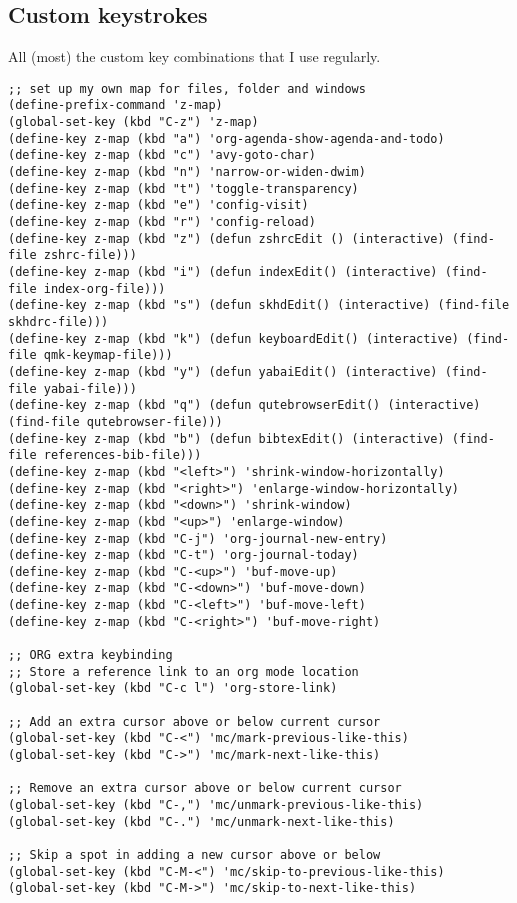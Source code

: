 \documentclass[11pt]{article}
\begin{document}
\subsection{Custom keystrokes}
\label{sec:org906f9f2}
All (most) the custom key combinations that I use regularly.
\begin{verbatim}
;; set up my own map for files, folder and windows
(define-prefix-command 'z-map)
(global-set-key (kbd "C-z") 'z-map)
(define-key z-map (kbd "a") 'org-agenda-show-agenda-and-todo)
(define-key z-map (kbd "c") 'avy-goto-char)
(define-key z-map (kbd "n") 'narrow-or-widen-dwim)
(define-key z-map (kbd "t") 'toggle-transparency)
(define-key z-map (kbd "e") 'config-visit)
(define-key z-map (kbd "r") 'config-reload)
(define-key z-map (kbd "z") (defun zshrcEdit () (interactive) (find-file zshrc-file)))
(define-key z-map (kbd "i") (defun indexEdit() (interactive) (find-file index-org-file)))
(define-key z-map (kbd "s") (defun skhdEdit() (interactive) (find-file skhdrc-file)))
(define-key z-map (kbd "k") (defun keyboardEdit() (interactive) (find-file qmk-keymap-file)))
(define-key z-map (kbd "y") (defun yabaiEdit() (interactive) (find-file yabai-file)))
(define-key z-map (kbd "q") (defun qutebrowserEdit() (interactive) (find-file qutebrowser-file)))
(define-key z-map (kbd "b") (defun bibtexEdit() (interactive) (find-file references-bib-file)))
(define-key z-map (kbd "<left>") 'shrink-window-horizontally)
(define-key z-map (kbd "<right>") 'enlarge-window-horizontally)
(define-key z-map (kbd "<down>") 'shrink-window)
(define-key z-map (kbd "<up>") 'enlarge-window)
(define-key z-map (kbd "C-j") 'org-journal-new-entry) 
(define-key z-map (kbd "C-t") 'org-journal-today)
(define-key z-map (kbd "C-<up>") 'buf-move-up)
(define-key z-map (kbd "C-<down>") 'buf-move-down)
(define-key z-map (kbd "C-<left>") 'buf-move-left)
(define-key z-map (kbd "C-<right>") 'buf-move-right)

;; ORG extra keybinding
;; Store a reference link to an org mode location
(global-set-key (kbd "C-c l") 'org-store-link)

;; Add an extra cursor above or below current cursor
(global-set-key (kbd "C-<") 'mc/mark-previous-like-this)
(global-set-key (kbd "C->") 'mc/mark-next-like-this)

;; Remove an extra cursor above or below current cursor
(global-set-key (kbd "C-,") 'mc/unmark-previous-like-this)
(global-set-key (kbd "C-.") 'mc/unmark-next-like-this)

;; Skip a spot in adding a new cursor above or below
(global-set-key (kbd "C-M-<") 'mc/skip-to-previous-like-this)
(global-set-key (kbd "C-M->") 'mc/skip-to-next-like-this)


\end{verbatim}
\end{document}
